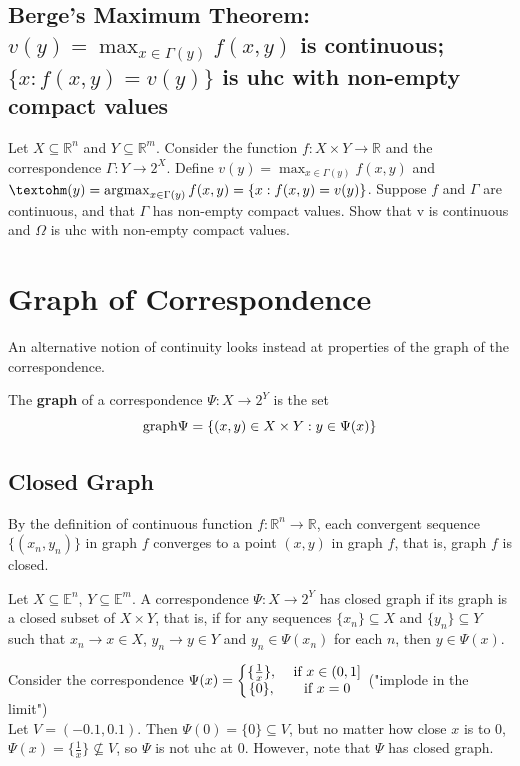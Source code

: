 \documentclass[11pt]{elegantbook}
\newcommand{\argmax}{\operatornamewithlimits{argmax}}
\begin{document}
\subsection{Berge's Maximum Theorem: $v(y)=\max_{x\in\Gamma(y)}f(x,y)$ is continuous; $\{x:f(x,y)=v(y)\}$ is uhc with non-empty compact values}
\begin{theorem}
    Let $X \subseteq \mathbb{R}^n$ and $Y \subseteq \mathbb{R}^m$. Consider the function $f : X \times Y \rightarrow \mathbb{R}$ and the correspondence $\Gamma : Y \rightarrow 2^X$. Define $v(y) = \max_{x\in\Gamma(y)} f(x, y)$ and $Ω(y) = \argmax_{x\in\Gamma(y)} f(x, y)=\{x:f(x,y)=v(y)\}$. Suppose $f$ and $\Gamma$ are continuous, and that $\Gamma$ has non-empty compact values. Show that v is continuous and $\Omega$ is uhc with non-empty compact values.
\end{theorem}




\section{Graph of Correspondence}
An alternative notion of continuity looks instead at properties of the graph of the correspondence.
\begin{definition}
    \normalfont
    The \textbf{graph} of a correspondence $\Psi : X \rightarrow 2^Y$ is the set
    $$\textnormal{graph}\Psi=\{(x,y)\in X\times Y:y\in\Psi(x)\}$$
\end{definition}

\subsection{Closed Graph}
By the definition of continuous function $f:\mathbb{R}^n \rightarrow \mathbb{R}$,  each convergent sequence $\{(x_n, y_n)\}$ in graph $f$ converges to a point $(x, y)$ in graph $f$, that is, graph $f$ is closed.

\begin{definition}
    \normalfont
    Let $X\subseteq \mathbb{E}^n$, $Y\subseteq \mathbb{E}^m$. A correspondence $\Psi: X \rightarrow 2^Y$ has closed graph if its graph is a closed subset of $X \times Y$, that is, if for any sequences $\{x_n\} \subseteq X$ and $\{y_n\} \subseteq Y$ such that $x_n \rightarrow x \in X$, $y_n \rightarrow y \in Y$ and $y_n \in \Psi(x_n)$ for each $n$, then $y \in \Psi(x)$.
\end{definition}
\begin{example}
    Consider the correspondence $\Psi(x)=\left\{\begin{matrix}
        \{\frac{1}{x}\},&\textnormal{ if }x\in(0,1]\\
        \{0\},&\textnormal{ if }x=0
    \end{matrix}\right.$ ("implode in the limit")\\
    Let $V = (-0.1, 0.1)$. Then $\Psi(0) = \{0\} \subseteq V$, but no matter how close $x$ is to $0$, $\Psi(x)=\{\frac{1}{x}\}\nsubseteq V$, so $\Psi$ is not uhc at $0$. However, note that $\Psi$ has closed graph.
\end{example}
\end{document}
